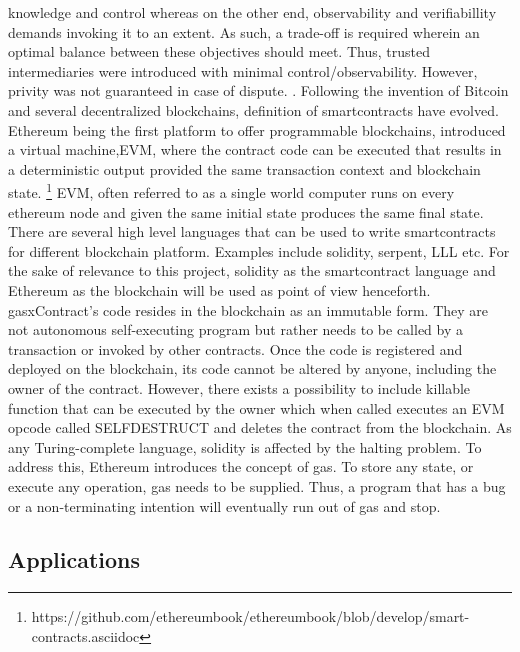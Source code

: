 knowledge and control whereas on the other end, observability and
verifiabillity demands invoking it to an extent. As such, a trade-off is
required wherein an optimal balance between these objectives should meet. Thus,
trusted intermediaries were introduced with minimal control/observability.
However, privity was not guaranteed in case of dispute. 
\cite{szabo1997formalizing}.
Following the invention of Bitcoin and several decentralized blockchains,
definition of smartcontracts have evolved. Ethereum being the first platform to
offer programmable blockchains, introduced a virtual machine,EVM, where the
contract code can be executed that results in a deterministic output provided
the same transaction context and blockchain state. 
\footnote{https://github.com/ethereumbook/ethereumbook/blob/develop/smart-contracts.asciidoc}
EVM, often referred to as a single world computer runs on every ethereum node
and given the same initial state produces the same final state. There are
several high level languages that can be used to write smartcontracts for
different blockchain platform. Examples include solidity, serpent, LLL etc.
For the sake of relevance to this project, solidity as the smartcontract
language and Ethereum as the blockchain will be used as point of view
henceforth. gasxContract's code resides in the blockchain as an immutable form.
They are not autonomous self-executing program but rather needs to be called by
a transaction or invoked by other contracts. Once the code is registered and
deployed on the blockchain, its code cannot be altered by anyone, including the
owner of the contract. However, there exists a possibility to include killable
function that can be executed by the owner which when called executes an EVM
opcode called SELFDESTRUCT and deletes the contract from the blockchain.  As
any Turing-complete language, solidity is affected by the halting problem.  To
address this, Ethereum introduces the concept of gas. To store any state, or
execute any operation, gas needs to be supplied. Thus, a program that has a bug
or a non-terminating intention will eventually run out of gas and
stop.\cite{whataresmartcontracts} 

\subsection{Applications}




